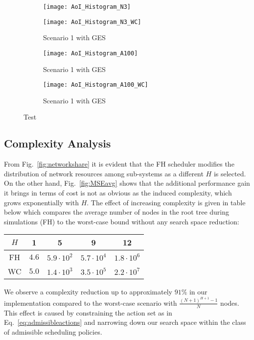 \begin{figure}[htb]
  \centering
  \begin{subfigure}[b]{0.49\textwidth}
      \centering
      \texttt{[image: AoI\_Histogram\_N3]}
      \caption{} 
  \end{subfigure}
  \begin{subfigure}[b]{0.49\textwidth}
      \centering
      \texttt{[image: AoI\_Histogram\_N3\_WC]}
      \caption{Scenario 1 with GES}
  \end{subfigure}
  \begin{subfigure}[b]{0.49\textwidth}
      \centering
      \texttt{[image: AoI\_Histogram\_A100]}
      \caption{Scenario 1 with GES}
  \end{subfigure}
  \begin{subfigure}[b]{0.49\textwidth}
      \centering
      \texttt{[image: AoI\_Histogram\_A100\_WC]}
      \caption{Scenario 1 with GES}
  \end{subfigure}
     \caption[Test]{Test}
     \label{fig:AoIHist}
\end{figure}

\subsection{Complexity Analysis}
From Fig.~\ref{fig:networkshare} it is evident that the FH scheduler modifies
the distribution of network resources among sub-systems as a different $H$ is
selected. On the other hand, Fig.~\ref{fig:MSEavg} shows that the additional
performance gain it brings in terms of cost is not as obvious as the induced
complexity, which grows exponentially with $H$. The effect of increasing
complexity is given in table below which compares the average number of nodes in
the root tree during simulations (FH) to the worst-case bound without any search
space reduction: 

\begin{center}
	\begin{tabular}{ c | c |c | c | c}
		$H$ & 1 & 5 & 9 & 12 \\ 
		\hline
		FH & $4.6$ & $5.9\cdot10^2$ & $5.7\cdot10^4$ & $1.8\cdot10^6$ \\		
		WC & $5.0$ & $1.4\cdot10^3$ & $3.5\cdot10^5$& $2.2\cdot10^7$ \\ 
	\end{tabular}
\end{center}

We observe a complexity reduction up to approximately $91\%$ in our
implementation compared to the worst-case scenario with $\frac{(N + 1)^{H+1} -
1}{N}$ nodes. This effect is caused by constraining the action set as in
Eq.~\eqref{eq:admissibleactions} and narrowing down our search space within the
class of admissible scheduling policies.

